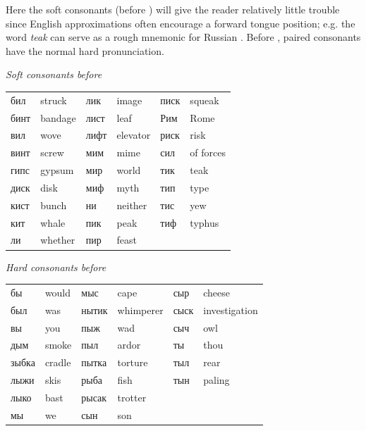 Here the soft consonants (before ) will give the reader relatively little trouble since English approximations often encourage a forward tongue position; e.g. the word \emph{teak} can serve as a rough mnemonic for Russian . Before , paired consonants have the normal hard pronunciation.

\begin{keybox}[Exercise 2.2(v)]
\textit{Soft consonants before }
\end{keybox}

\begingroup
\small
\setlength{\tabcolsep}{1.5pt}
\begin{longtable}{@{}>{\cyrillicfont}p{20mm} p{23mm} >{\cyrillicfont}p{20mm} p{23mm} >{\cyrillicfont}p{20mm} p{26mm}@{}}
бил & struck & лик & image & писк & squeak\\
бинт & bandage & лист & leaf & Рим & Rome\\
вил & wove & лифт & elevator & риск & risk\\
винт & screw & мим & mime & сил & of forces\\
гипс & gypsum & мир & world & тик & teak\\
диск & disk & миф & myth & тип & type\\
кист & bunch & ни & neither & тис & yew\\
кит & whale & пик & peak & тиф & typhus\\
ли & whether & пир & feast & & \\
\end{longtable}
\endgroup

\begin{keybox}
\textit{Hard consonants before }
\end{keybox}

\begingroup
\small
\setlength{\tabcolsep}{1.5pt}
\begin{longtable}{@{}>{\cyrillicfont}p{20mm} p{23mm} >{\cyrillicfont}p{20mm} p{23mm} >{\cyrillicfont}p{20mm} p{26mm}@{}}
бы & would & мыс & cape & сыр & cheese\\
был & was & нытик & whimperer & сыск & investigation\\
вы & you & пыж & wad & сыч & owl\\
дым & smoke & пыл & ardor & ты & thou\\
зыбка & cradle & пытка & torture & тыл & rear\\
лыжи & skis & рыба & fish & тын & paling\\
лыко & bast & рысак & trotter & & \\
мы & we & сын & son & & \\
\end{longtable}
\endgroup

